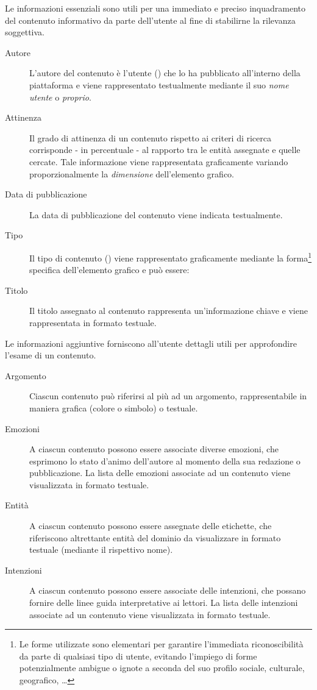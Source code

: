 \documentclass[10pt,a4paper,headinclude,footinclude,hidelinks]{scrreprt} %
\begin{document}
	Le informazioni essenziali sono utili per una immediato e preciso inquadramento del contenuto informativo da parte dell'utente al fine di stabilirne la rilevanza soggettiva.
	\begin{description}
	\item[Autore] L'autore del contenuto è l'utente (\textit{}) che lo ha pubblicato all'interno della piattaforma e viene rappresentato testualmente mediante il suo \textit{nome utente} o \textit{proprio}.
	\item[Attinenza] Il grado di attinenza di un contenuto rispetto ai criteri di ricerca corrisponde - in percentuale - al rapporto tra le entità assegnate e quelle cercate. Tale informazione viene rappresentata graficamente variando proporzionalmente la \textit{dimensione} dell'elemento grafico.
	\item[Data di pubblicazione] La data di pubblicazione del contenuto viene indicata testualmente.
	\item[Tipo] Il tipo di contenuto (\textit{}) viene rappresentato graficamente mediante la forma\footnote{Le forme utilizzate sono elementari per garantire l'immediata riconoscibilità da parte di qualsiasi tipo di utente, evitando l'impiego di forme potenzialmente ambigue o ignote a seconda del suo profilo sociale, culturale, geografico, \ldots} specifica dell'elemento grafico e può essere:
	\item[Titolo] Il titolo assegnato al contenuto rappresenta un'informazione chiave e viene rappresentata in formato testuale.
	\end{description}

	Le informazioni aggiuntive forniscono all'utente dettagli utili per approfondire l'esame di un contenuto.
	\begin{description}
	\item[Argomento] Ciascun contenuto può riferirsi al più ad un argomento, rappresentabile in maniera grafica (colore o simbolo) o testuale.
	\item[Emozioni] A ciascun contenuto possono essere associate diverse emozioni, che esprimono lo stato d'animo dell'autore al momento della sua redazione o pubblicazione. La lista delle emozioni associate ad un contenuto viene visualizzata in formato testuale.
	\item[Entit\`a] A ciascun contenuto possono essere assegnate delle etichette, che riferiscono altrettante entità del dominio da visualizzare in formato testuale (mediante il rispettivo nome).
	\item[Intenzioni] A ciascun contenuto possono essere associate delle intenzioni, che possano fornire delle linee guida interpretative ai lettori. La lista delle intenzioni associate ad un contenuto viene visualizzata in formato testuale.
	\end{description}
\end{document}
